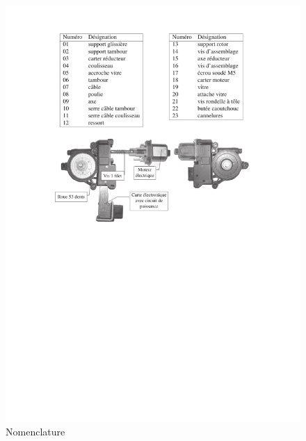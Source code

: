 \begin{figure}[!h]
 \centering\includegraphics[width=0.9\linewidth]{img/eclate1_2}
 \caption{Nomenclature}
 \label{an011}
\end{figure}

